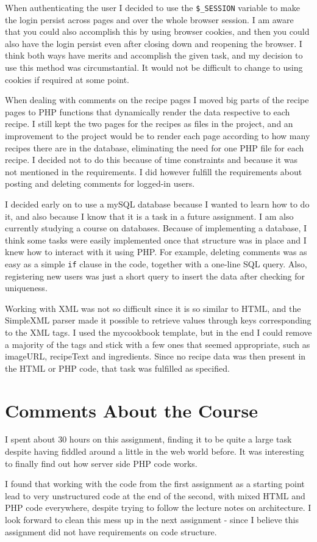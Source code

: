 \documentclass[a4paper]{scrreprt}
\newcommand{\code}[1]{\texttt{#1}}
\begin{document}
When authenticating the user I decided to use the \code{\$\_SESSION} variable to make the login persist across pages and over the whole browser session. I am aware that you could also accomplish this by using browser cookies, and then you could also have the login persist even after closing down and reopening the browser. I think both ways have merits and accomplish the given task, and my decision to use this method was circumstantial. It would not be difficult to change to using cookies if required at some point.

When dealing with comments on the recipe pages I moved big parts of the recipe pages to PHP functions that dynamically render the data respective to each recipe. I still kept the two pages for the recipes as files in the project, and an improvement to the project would be to render each page according to how many recipes there are in the database, eliminating the need for one PHP file for each recipe. I decided not to do this because of time constraints and because it was not mentioned in the requirements. I did however fulfill the requirements about posting and deleting comments for logged-in users.

I decided early on to use a mySQL database because I wanted to learn how to do it, and also because I know that it is a task in a future assignment. I am also currently studying a course on databases. Because of implementing a database, I think some tasks were easily implemented once that structure was in place and I knew how to interact with it using PHP. For example, deleting comments was as easy as a simple \code{if} clause in the code, together with a one-line SQL query. Also, registering new users was just a short query to insert the data after checking for uniqueness.

Working with XML was not so difficult since it is so similar to HTML, and the SimpleXML parser made it possible to retrieve values through keys corresponding to the XML tags. I used the mycookbook template, but in the end I could remove a majority of the tags and stick with a few ones that seemed appropriate, such as imageURL, recipeText and ingredients. Since no recipe data was then present in the HTML or PHP code, that task was fulfilled as specified.

\chapter{Comments About the Course}

I spent about 30 hours on this assignment, finding it to be quite a large task despite having fiddled around a little in the web world before. It was interesting to finally find out how server side PHP code works. 

I found that working with the code from the first assignment as a starting point lead to very unstructured code at the end of the second, with mixed HTML and PHP code everywhere, despite trying to follow the lecture notes on architecture. I look forward to clean this mess up in the next assignment - since I believe this assignment did not have requirements on code structure.
\end{document}
